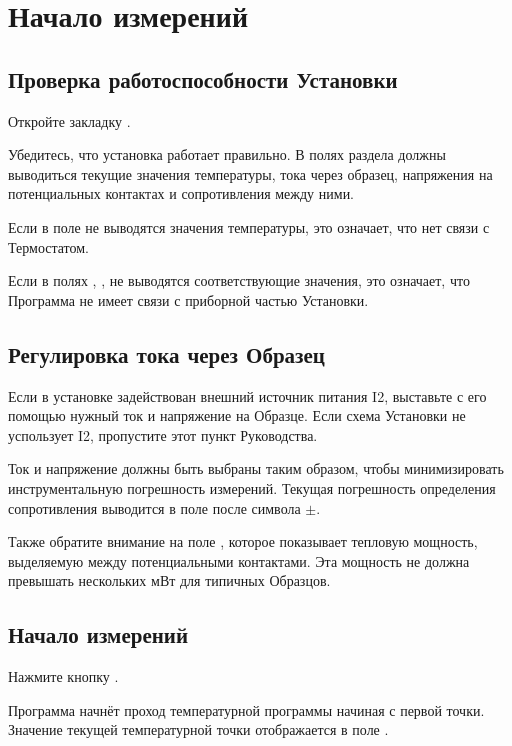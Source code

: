 \documentclass[12pt, a4paper, twocolumn]{report}
\begin{document}
\section{Начало измерений}

\subsection{Проверка работоспособности Установки}

Откройте закладку .

Убедитесь, что установка работает правильно. В полях раздела  должны выводиться текущие значения температуры, тока через образец, напряжения на потенциальных контактах и сопротивления между ними.

Если в поле  не выводятся значения температуры, это означает, что нет связи с Термостатом.

Если в полях , ,  не выводятся соответствующие значения, это означает, что Программа не имеет связи с приборной частью Установки.

\subsection{Регулировка тока через Образец}

Если в установке задействован внешний источник питания I2, выставьте с его помощью нужный ток и напряжение на Образце. Если схема Установки не успользует I2, пропустите этот пункт Руководства.

Ток и напряжение должны быть выбраны таким образом, чтобы минимизировать инструментальную погрешность измерений. Текущая погрешность определения сопротивления выводится в поле  после символа $\pm$.

Также обратите внимание на поле , которое показывает тепловую мощность, выделяемую между потенциальными контактами. Эта мощность не должна превышать нескольких мВт для типичных Образцов.

\subsection{Начало измерений}

Нажмите кнопку .

Программа начнёт проход температурной программы начиная с первой точки. Значение текущей температурной точки отображается в поле . 
\end{document}
